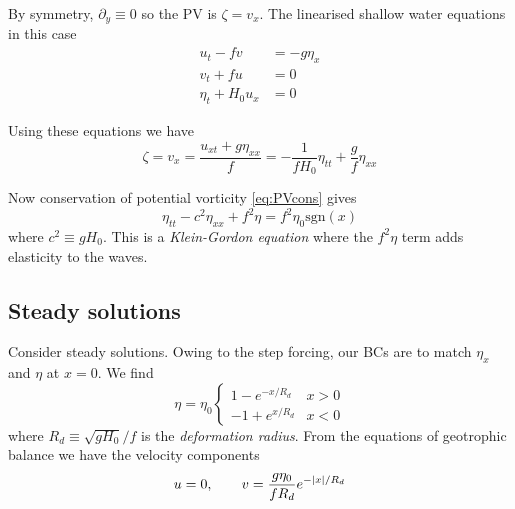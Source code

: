 \documentclass{jknotes}
\newcommand{\sgn}{\text{sgn}}
\begin{document}
By symmetry, $\partial_y \equiv 0$ so the PV is $\zeta = v_x$. The linearised
shallow water equations in this case
\begin{align}
	u_t - fv &= -g\eta_x \\
	v_t + fu &= 0 \\
	\eta_t + H_0 u_x &= 0
\end{align}

Using these equations we have
\begin{equation}
	\zeta = v_x = \frac{u_{xt} + g\eta_{xx}}{f} = -\frac{1}{f H_0} \eta_{tt} +
	\frac{g}{f}\eta_{xx}
\end{equation}

Now conservation of potential vorticity \eqref{eq:PVcons} gives
\begin{equation}
	\eta_{tt} - c^2 \eta_{xx} + f^2 \eta = f^2 \eta_0 \sgn(x)
\end{equation}
where $c^2 \equiv g H_0$. This is a \emph{Klein-Gordon equation} where the
$f^2\eta$ term adds elasticity to the waves.

\subsection{Steady solutions}
Consider steady solutions. Owing to the step forcing, our BCs are to match
$\eta_x$ and $\eta$ at $x=0$. We find
\begin{equation}
	\eta = \eta_0 \begin{cases} 1 - e^{-x/R_d} & x > 0 \\ -1 + e^{x/R_d} & x <
	0 \end{cases} \label{eq:gasoln}
\end{equation}
where $R_d \equiv \sqrt{gH_0}/f$ is the \emph{deformation radius}. From the
equations of geotrophic balance we have the velocity components
\begin{equation}
	u = 0, \hspace{2em} v = \frac{g \eta_0}{fR_d} e^{-\abs{x}/R_d}
\end{equation}
\begin{center}
\end{center}
\end{document}
